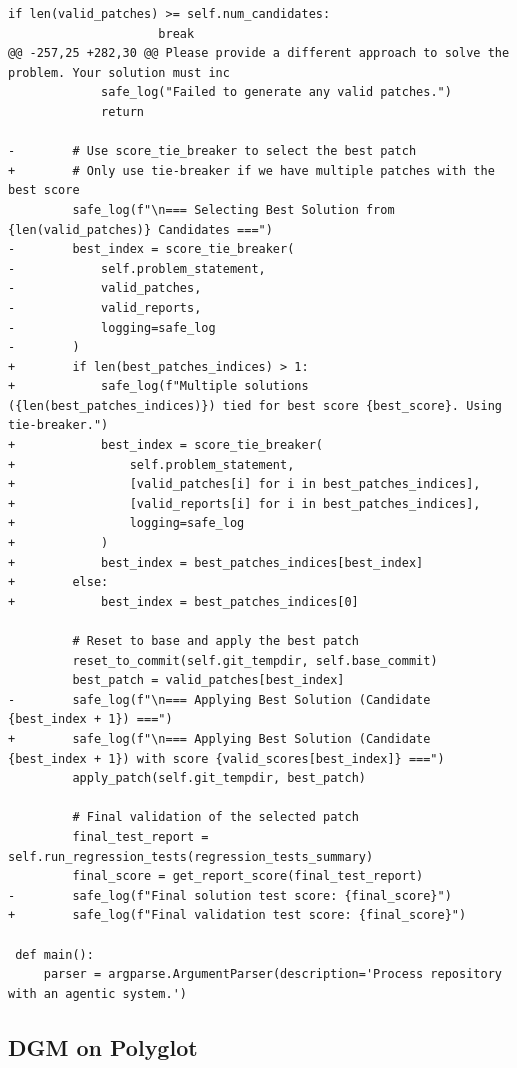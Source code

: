 \documentclass{article} %
\begin{document}
\begin{lstlisting}[style=diffstyle]
                 if len(valid_patches) >= self.num_candidates:
                     break
@@ -257,25 +282,30 @@ Please provide a different approach to solve the problem. Your solution must inc
             safe_log("Failed to generate any valid patches.")
             return
 
-        # Use score_tie_breaker to select the best patch
+        # Only use tie-breaker if we have multiple patches with the best score
         safe_log(f"\n=== Selecting Best Solution from {len(valid_patches)} Candidates ===")
-        best_index = score_tie_breaker(
-            self.problem_statement,
-            valid_patches,
-            valid_reports,
-            logging=safe_log
-        )
+        if len(best_patches_indices) > 1:
+            safe_log(f"Multiple solutions ({len(best_patches_indices)}) tied for best score {best_score}. Using tie-breaker.")
+            best_index = score_tie_breaker(
+                self.problem_statement,
+                [valid_patches[i] for i in best_patches_indices],
+                [valid_reports[i] for i in best_patches_indices],
+                logging=safe_log
+            )
+            best_index = best_patches_indices[best_index]
+        else:
+            best_index = best_patches_indices[0]
 
         # Reset to base and apply the best patch
         reset_to_commit(self.git_tempdir, self.base_commit)
         best_patch = valid_patches[best_index]
-        safe_log(f"\n=== Applying Best Solution (Candidate {best_index + 1}) ===")
+        safe_log(f"\n=== Applying Best Solution (Candidate {best_index + 1}) with score {valid_scores[best_index]} ===")
         apply_patch(self.git_tempdir, best_patch)
 
         # Final validation of the selected patch
         final_test_report = self.run_regression_tests(regression_tests_summary)
         final_score = get_report_score(final_test_report)
-        safe_log(f"Final solution test score: {final_score}")
+        safe_log(f"Final validation test score: {final_score}")
 
 def main():
     parser = argparse.ArgumentParser(description='Process repository with an agentic system.')
\end{lstlisting}


\subsection{DGM on Polyglot}
\label{app:best-agent-dgm-polyglot}
\end{document}
